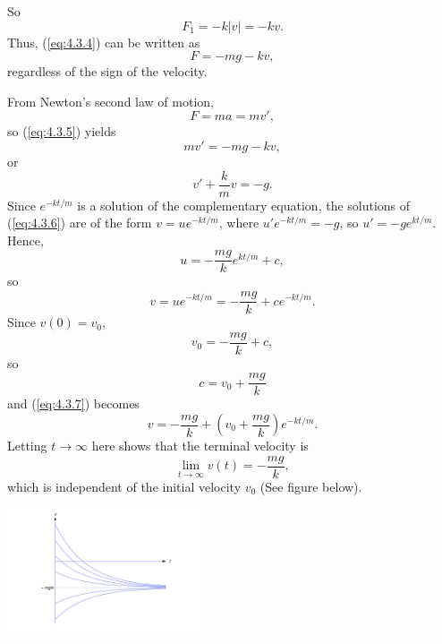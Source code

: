 \documentclass{ximera}
\begin{document}
\begin{example}
\begin{explanation}
So
$$
F_1=-k|v|=-kv.
$$
Thus, (\ref{eq:4.3.4}) can be written as
\begin{equation} \label{eq:4.3.5}
F=-mg-kv,
\end{equation}
regardless of the sign of the velocity.
 
From Newton's second law of motion,
$$
F=ma=mv',
$$
 so (\ref{eq:4.3.5}) yields
$$
mv'=-mg-kv,
$$
 or
\begin{equation} \label{eq:4.3.6}
v'+\frac{k}{m}v=-g.
\end{equation}
Since $e^{-kt/m}$ is a solution of the  complementary
equation, the solutions of (\ref{eq:4.3.6}) are of the form
$v=ue^{-kt/m}$, where $u'e^{-kt/m}=-g$, so $u'=-ge^{kt/m}$.
Hence,
$$
u=-\frac{mg}{k} e^{kt/m}+c,
$$
so
\begin{equation} \label{eq:4.3.7}
v=ue^{-kt/m}=-\frac{mg}{k}+ce^{-kt/m}.
\end{equation}
Since
 $v(0)=v_0$,
$$
v_0=-\frac{mg}{k}+c,
$$
 so
$$
c=v_0+\frac{mg}{k}
$$
 and (\ref{eq:4.3.7}) becomes
$$
v=-\frac{mg}{k}+\left(v_0+\frac{mg}{k}\right) e^{-kt/m}.
$$
Letting $t\rightarrow\infty$ here shows that the terminal velocity is
$$
\lim_{t\rightarrow\infty} v(t)=-\frac{mg}{k},
$$
which  is independent of the
initial velocity $v_0$ (See figure below).
 
\begin{image}
  \includegraphics[height=1.5in]{fig040302.jpg}
\end{image}
 
\end{explanation}
\end{example}
 
\end{document}
